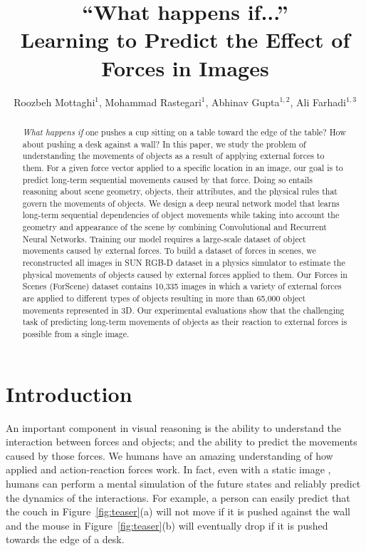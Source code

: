 \documentclass[runningheads]{llncs}
\begin{document}
\pagestyle{headings}
\mainmatter

\title{``What happens if...''\\Learning to Predict the Effect of Forces in Images}

\titlerunning{}


\author{Roozbeh Mottaghi$^1$, Mohammad Rastegari$^1$, Abhinav Gupta$^{1,2}$, Ali Farhadi$^{1,3}$}


\maketitle

\begin{abstract}
\textit{What happens if} one pushes a cup sitting on a table toward the edge of the table? How about pushing a desk against a wall? 
In this paper, we study the problem of understanding the movements of objects as a result of applying external forces to them. For a given force vector applied to a specific location in an image, our goal is to predict long-term sequential movements caused by that force. Doing so entails reasoning about scene geometry, objects, their attributes, and the physical rules that govern the movements of objects. We design a deep neural network model that learns long-term sequential dependencies of object movements while taking into account the geometry and appearance of the scene by combining Convolutional and Recurrent Neural Networks. Training our model requires a large-scale dataset of object movements caused by external forces. To build a dataset of forces in scenes, we reconstructed all images in SUN RGB-D dataset in a physics simulator to estimate the physical movements of objects caused by external forces applied to them. Our Forces in Scenes (ForScene) dataset contains 10,335 images in which a variety of external forces are applied to different types of objects resulting in more than 65,000 object movements represented in 3D. Our experimental evaluations show that the challenging task of predicting long-term movements of objects as their reaction to external forces is possible from a single image. 
\end{abstract}


\section{Introduction}
An important component in visual reasoning is the ability to understand the interaction between forces and objects; and the ability to predict the movements caused by those forces. We humans have an amazing understanding of how  applied and action-reaction forces work. In fact, even with a static image \cite{hamrick11,battaglia13}, humans can perform a mental simulation of the future states and reliably predict the dynamics of the interactions. For example, a person can easily predict that the couch in Figure~\ref{fig:teaser}(a) will not move if it is pushed against the wall and the mouse in Figure~\ref{fig:teaser}(b) will eventually drop if it is pushed towards the edge of a desk. 
\end{document}
